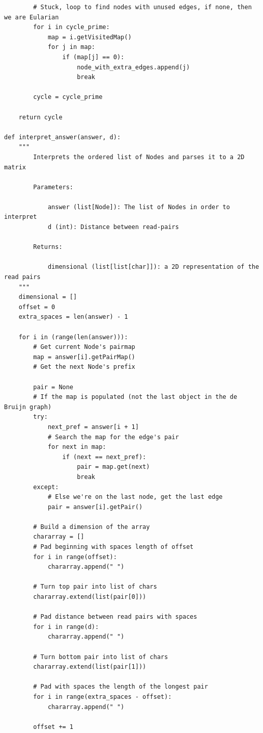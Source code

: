 \documentclass{article}
\begin{document}
\begin{lstlisting}
        # Stuck, loop to find nodes with unused edges, if none, then we are Eularian
        for i in cycle_prime:
            map = i.getVisitedMap()
            for j in map:
                if (map[j] == 0):
                    node_with_extra_edges.append(j)
                    break

        cycle = cycle_prime

    return cycle

def interpret_answer(answer, d):
    """
        Interprets the ordered list of Nodes and parses it to a 2D matrix

        Parameters:

            answer (list[Node]): The list of Nodes in order to interpret
            d (int): Distance between read-pairs

        Returns:

            dimensional (list[list[char]]): a 2D representation of the read pairs
    """
    dimensional = []
    offset = 0
    extra_spaces = len(answer) - 1

    for i in (range(len(answer))):
        # Get current Node's pairmap
        map = answer[i].getPairMap()
        # Get the next Node's prefix
        
        pair = None
        # If the map is populated (not the last object in the de Bruijn graph)
        try:
            next_pref = answer[i + 1]
            # Search the map for the edge's pair
            for next in map:
                if (next == next_pref):
                    pair = map.get(next)
                    break
        except:
            # Else we're on the last node, get the last edge
            pair = answer[i].getPair()

        # Build a dimension of the array
        chararray = []
        # Pad beginning with spaces length of offset
        for i in range(offset):
            chararray.append(" ")

        # Turn top pair into list of chars
        chararray.extend(list(pair[0]))

        # Pad distance between read pairs with spaces
        for i in range(d):
            chararray.append(" ")

        # Turn bottom pair into list of chars
        chararray.extend(list(pair[1]))

        # Pad with spaces the length of the longest pair
        for i in range(extra_spaces - offset):
            chararray.append(" ")

        offset += 1


\end{lstlisting}
\end{document}
